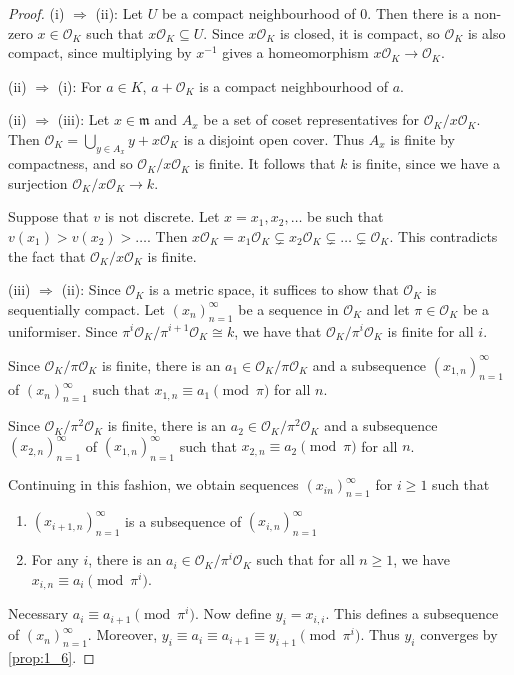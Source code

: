 \documentclass[11pt]{article}
\theoremstyle{definition}
\theoremstyle{plain}
\theoremstyle{remark}
\newcommand{\cO}{\mathcal{O}}
\newcommand{\fm}{\mathfrak{m}}
\begin{document}
\begin{proof}
    (i) $\Rightarrow$ (ii): Let $U$ be a compact neighbourhood of $0$. Then there is a non-zero $x \in \cO_K$ such that $x \cO_K \subseteq U$. Since $x \cO_K$ is closed, it is compact, so $\cO_K$ is also compact, since multiplying by $x^{-1}$ gives a homeomorphism $x \cO_K \to \cO_K$.

    \noindent (ii) $\Rightarrow$ (i): For $a \in K$, $a + \cO_K$ is a compact neighbourhood of $a$.

    \noindent (ii) $\Rightarrow$ (iii): Let $x \in \fm$ and $A_x$ be a set of coset representatives for $\cO_K / x \cO_K$. Then $\cO_K = \bigcup_{y \in A_x} y + x \cO_K$ is a disjoint open cover. Thus $A_x$ is finite by compactness, and so $\cO_K / x \cO_K$ is finite. It follows that $k$ is finite, since we have a surjection $\cO_K / x \cO_K \to k$.

    Suppose that $v$ is not discrete. Let $x = x_1, x_2, \ldots$ be such that $v(x_1) > v(x_2) > \ldots$. Then $x \cO_K = x_1 \cO_K \subsetneq x_2 \cO_K \subsetneq \ldots \subsetneq \cO_K$. This contradicts the fact that $\cO_K / x \cO_K$ is finite.

    \noindent (iii) $\Rightarrow$ (ii): Since $\cO_K$ is a metric space, it suffices to show that $\cO_K$ is sequentially compact. Let $(x_n)_{n=1}^\infty$ be a sequence in $\cO_K$ and let $\pi \in \cO_K$ be a uniformiser. Since $\pi^i \cO_K / \pi^{i+1} \cO_K \cong k$, we have that $\cO_K / \pi^i \cO_K$ is finite for all $i$.

    Since $\cO_K/\pi \cO_K$ is finite, there is an $a_1 \in \cO_K/\pi \cO_K$ and a subsequence $(x_{1,n})_{n=1}^\infty$ of $(x_n)_{n=1}^\infty$ such that $x_{1,n} \equiv a_1 \pmod{\pi}$ for all $n$.

    Since $\cO_K/\pi^2 \cO_K$ is finite, there is an $a_2 \in \cO_K/\pi^2 \cO_K$ and a subsequence $(x_{2,n})_{n=1}^\infty$ of $(x_{1,n})_{n=1}^\infty$ such that $x_{2,n} \equiv a_2 \pmod{\pi}$ for all $n$.

    Continuing in this fashion, we obtain sequences $(x_{in})_{n=1}^\infty$ for $i \ge 1$ such that
    \begin{enumerate}
        \item $(x_{i+1, n})_{n=1}^\infty$ is a subsequence of $(x_{i, n})_{n=1}^\infty$
        \item For any $i$, there is an $a_i \in \cO_K / \pi^i \cO_K$ such that for all $n \ge 1$, we have $x_{i,n} \equiv a_i \pmod{\pi^i}$.
    \end{enumerate}
    Necessary $a_i \equiv a_{i+1} \pmod{\pi^i}$. Now define $y_i = x_{i,i}$. This defines a subsequence of $(x_n)_{n=1}^\infty$. Moreover, $y_i \equiv a_i \equiv a_{i+1} \equiv y_{i+1} \pmod{\pi^i}$. Thus $y_i$ converges by \autoref{prop:1_6}.
\end{proof}
\end{document}
